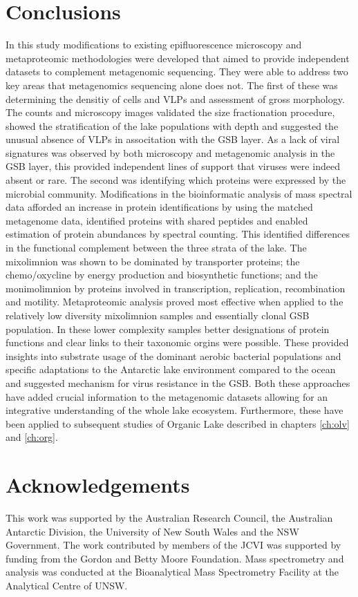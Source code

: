 \section{Conclusions}
In this study modifications to existing epifluorescence microscopy and metaproteomic methodologies were developed that aimed to provide independent datasets to complement metagenomic sequencing.
They were able to address two key areas that metagenomics sequencing alone does not.
The first of these was determining the densitiy of cells and \acp{VLP} and assessment of gross morphology.
The counts and microscopy images validated the size fractionation procedure, showed the stratification of the lake populations with depth and suggested the unusual absence of \acp{VLP} in associtation with the \ac{GSB} layer.
As a lack of viral signatures was observed by both microscopy and metagenomic analysis in the \ac{GSB} layer, this provided independent lines of support that viruses were indeed absent or rare.
The second was identifying which proteins were expressed by the microbial community. 
Modifications in the bioinformatic analysis of mass spectral data afforded an increase in protein identifications by using the matched metagenome data, identified proteins with shared peptides and enabled estimation of protein abundances by spectral counting.
This identified differences in the functional complement between the three strata of the lake.
The mixolimnion was shown to be dominated by transporter proteins; the chemo/oxycline by energy production and biosynthetic functions; and the monimolimnion by proteins involved in transcription, replication, recombination and motility.
Metaproteomic analysis proved most effective when applied to the relatively low diversity mixolimnion samples and essentially clonal \ac{GSB} population.
In these lower complexity samples better designations of protein functions and clear links to their taxonomic orgins were possible.
These provided insights into substrate usage of the dominant aerobic bacterial populations and specific adaptations to the Antarctic lake environment compared to the ocean and suggested mechanism for virus resistance in the \ac{GSB}.
Both these approaches have added crucial information to the metagenomic datasets allowing for an integrative understanding of the whole lake ecosystem.
Furthermore, these have been applied to subsequent studies of Organic Lake described in chapters \ref{ch:olv} and \ref{ch:org}. 

\section{Acknowledgements}
This work was supported by the Australian Research Council, the Australian Antarctic Division, the University of New South Wales and the \textsc{NSW} Government. 
The work contributed by members of the \ac{JCVI} was supported by funding from the Gordon and Betty Moore Foundation.
Mass spectrometry and analysis was conducted at the Bioanalytical Mass Spectrometry Facility at the Analytical Centre of \textsc{UNSW}.
